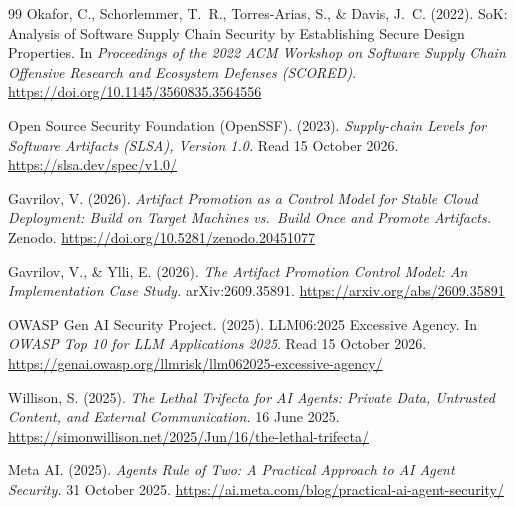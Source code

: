 \documentclass[11pt]{article}
\theoremstyle{definition}
\begin{document}
\begin{thebibliography}{99}
Okafor, C., Schorlemmer, T.~R., Torres-Arias, S., \& Davis, J.~C. (2022). SoK: Analysis of Software Supply Chain Security by Establishing Secure Design Properties. In \textit{Proceedings of the 2022 ACM Workshop on Software Supply Chain Offensive Research and Ecosystem Defenses (SCORED)}. \url{https://doi.org/10.1145/3560835.3564556}

Open Source Security Foundation (OpenSSF). (2023). \textit{Supply-chain Levels for Software Artifacts (SLSA), Version 1.0.} Read 15 October 2026. \url{https://slsa.dev/spec/v1.0/}

Gavrilov, V. (2026). \textit{Artifact Promotion as a Control Model for Stable Cloud Deployment: Build on Target Machines vs.\ Build Once and Promote Artifacts.} Zenodo. \url{https://doi.org/10.5281/zenodo.20451077}

Gavrilov, V., \& Ylli, E. (2026). \textit{The Artifact Promotion Control Model: An Implementation Case Study.} arXiv:2609.35891. \url{https://arxiv.org/abs/2609.35891}

OWASP Gen AI Security Project. (2025). LLM06:2025 Excessive Agency. In \textit{OWASP Top 10 for LLM Applications 2025}. Read 15 October 2026. \url{https://genai.owasp.org/llmrisk/llm062025-excessive-agency/}

Willison, S. (2025). \textit{The Lethal Trifecta for AI Agents: Private Data, Untrusted Content, and External Communication.} 16 June 2025. \url{https://simonwillison.net/2025/Jun/16/the-lethal-trifecta/}

Meta AI. (2025). \textit{Agents Rule of Two: A Practical Approach to AI Agent Security.} 31 October 2025. \url{https://ai.meta.com/blog/practical-ai-agent-security/}

\end{thebibliography}
\end{document}
